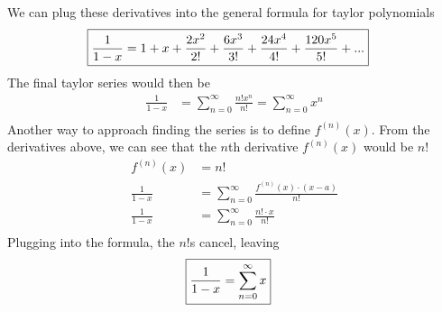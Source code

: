 \documentclass[12pt]{article}
\begin{document}
We can plug these derivatives into the general formula for taylor polynomials
\begin{align}
  \Aboxed{\frac{1}{1-x}                    & =1+x+\frac{2x^{2}}{2!}+\frac{6x^{3}}{3!}+\frac{24x^{4}}{4!}+\frac{120x^{5}}{5!}+...}
\end{align}
The final taylor series would then be
\begin{align}
  \frac{1}{1-x}                    & = \sum_{n=0}^{\infty}\frac{n!x^{n}}{n!}=\sum_{n=0}^{\infty}x^{n}                      \\
\end{align}
Another way to approach finding the series is to define $f^{(n)}(x)$. From the derivatives above, we can see that the $n$th derivative $f^{(n)}(x)$ would be $n!$
\begin{align}
  f^{\left(n\right)}\left(x\right) & =n!                                                                                   \\
  \frac{1}{1-x}                    & = \sum_{n=0}^{\infty}\frac{f^{\left(n\right)}\left(x\right)\cdot\left(x-a\right)}{n!} \\
  \frac{1}{1-x}                    & = \sum_{n=0}^{\infty}\frac{n!\cdot x}{n!}                                             \\
\end{align}
Plugging into the formula, the $n!$s cancel, leaving
\begin{align}
\Aboxed{\frac{1}{1-x}                    & = \sum_{n=0}^{\infty}x}
\end{align}
\end{document}
